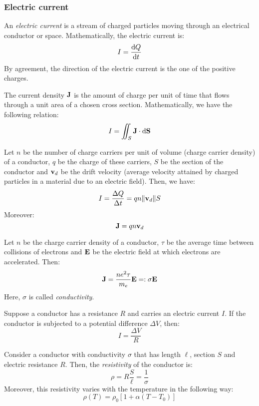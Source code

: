 \documentclass[../../../main.tex]{subfiles}
\begin{document}
\begin{multicols}{2}
  \subsubsection{Electric current}
  \begin{definition}
    An \textit{electric current} is a stream of charged particles moving through an electrical conductor or space. Mathematically, the electric current is: $$I=\dv{Q}{t}$$
    By agreement, the direction of the electric current is the one of the positive charges.
  \end{definition}
  \begin{definition}
    The current density $\boldsymbol{\mathrm{J}}$ is the amount of charge per unit of time that flows through a unit area of a chosen cross section. Mathematically, we have the following relation: $$I=\iint_S\boldsymbol{\mathrm{J}}\cdot\dd \boldsymbol{\mathrm{S}}$$
  \end{definition}
  \begin{prop}
    Let $n$ be the number of charge carriers per unit of volume (charge carrier density) of a conductor, $q$ be the charge of these carriers, $S$ be the section of the conductor and $\boldsymbol{\mathrm{v}}_d$ be the drift velocity (average velocity attained by charged particles in a material due to an electric field). Then, we have:
    $$I=\frac{\Delta Q}{\Delta t}=q n \|\boldsymbol{\mathrm{v}}_d\|S$$
    Moreover: $$\boldsymbol{\mathrm{J}}=q n\boldsymbol{\mathrm{v}}_d$$
  \end{prop}
  \begin{law}
    Let $n$ be the charge carrier density of a conductor, $\tau$ be the average time between collisions of electrons and $\boldsymbol{\mathrm{E}}$ be the electric field at which electrons are accelerated. Then: $$\boldsymbol{\mathrm{J}}=\frac{ne^2\tau}{m_e}\boldsymbol{\mathrm{E}}=:\sigma\boldsymbol{\mathrm{E}}$$
    Here, $\sigma$ is called \textit{conductivity}.
  \end{law}
  \begin{law}
    Suppose a conductor has a resistance $R$ and carries an electric current $I$. If the conductor is subjected to a potential difference $\Delta V$, then: $$I=\frac{\Delta V}{R}$$
  \end{law}
  \begin{definition}[Resistivity]
    Consider a conductor with conductivity $\sigma$ that has length $\ell$, section $S$ and electric resistance $R$. Then, the \textit{resistivity} of the conductor is: $$\rho=R\frac{S}{\ell}=\frac{1}{\sigma}$$
    Moreover, this resistivity varies with the temperature in the following way: $$\rho(T)=\rho_0\left[1+\alpha(T-T_0)\right]$$

\end{definition}
\end{multicols}
\end{document}
